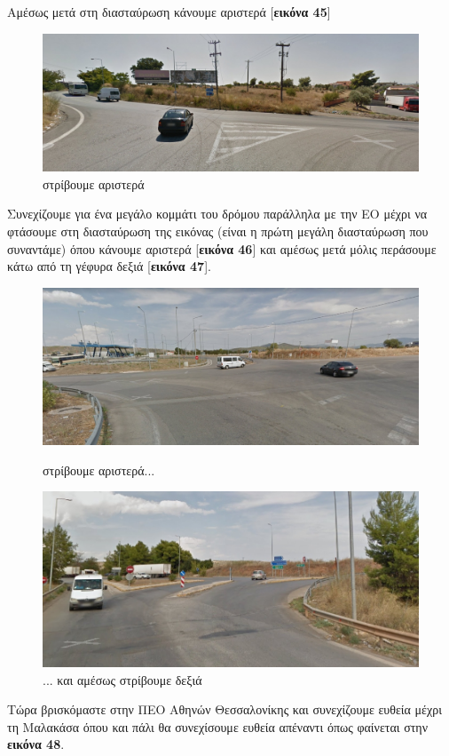 Αμέσως μετά στη διασταύρωση κάνουμε αριστερά [\textbf{εικόνα 45}]
\begin{figure}[H]
\includegraphics[width=\textwidth]{images/lamia-athina/afidnon/afidnon_021.jpg} 
\caption{στρίβουμε αριστερά}
\end{figure}
Συνεχίζουμε για ένα μεγάλο κομμάτι του δρόμου παράλληλα με την ΕΟ μέχρι να φτάσουμε στη διασταύρωση της εικόνας (είναι η πρώτη μεγάλη διασταύρωση που συναντάμε) όπου κάνουμε αριστερά [\textbf{εικόνα 46}] και αμέσως μετά μόλις περάσουμε κάτω από τη γέφυρα δεξιά [\textbf{εικόνα 47}].
\begin{figure}[H]
\includegraphics[width=\textwidth]{images/lamia-athina/afidnon/afidnon_022.jpg} 
\caption{στρίβουμε αριστερά...}
\includegraphics[width=\textwidth]{images/lamia-athina/afidnon/afidnon_023.jpg} 
\caption{... και αμέσως στρίβουμε δεξιά}
\end{figure}
Τώρα βρισκόμαστε στην ΠΕΟ Αθηνών Θεσσαλονίκης και συνεχίζουμε ευθεία μέχρι τη Μαλακάσα όπου και πάλι θα συνεχίσουμε ευθεία απέναντι όπως φαίνεται στην \textbf{εικόνα 48}.
